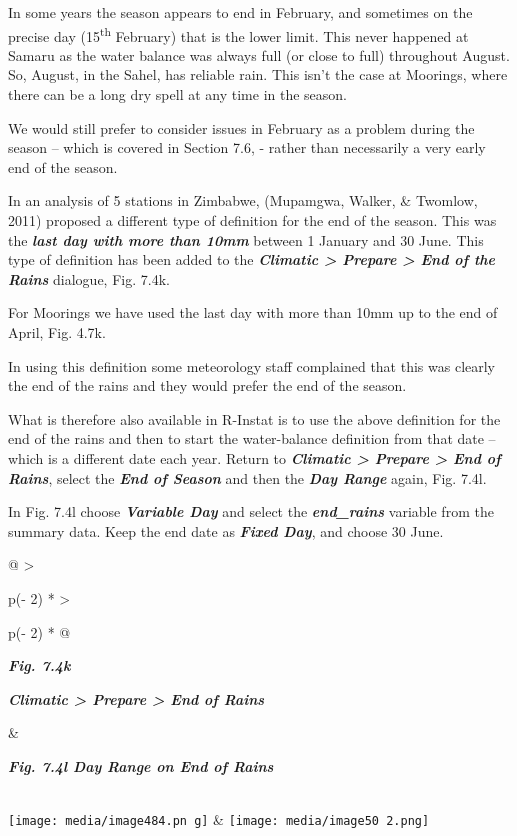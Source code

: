 \documentclass[
  letterpaper,
  DIV=11,
  numbers=noendperiod]{scrreprt}
\begin{document}
In some years the season appears to end in February, and sometimes on
the precise day (15\textsuperscript{th} February) that is the lower
limit. This never happened at Samaru as the water balance was always
full (or close to full) throughout August. So, August, in the Sahel, has
reliable rain. This isn't the case at Moorings, where there can be a
long dry spell at any time in the season.

We would still prefer to consider issues in February as a problem during
the season -- which is covered in Section 7.6, - rather than necessarily
a very early end of the season.

In an analysis of 5 stations in Zimbabwe, (Mupamgwa, Walker, \& Twomlow,
2011) proposed a different type of definition for the end of the season.
This was the \textbf{\emph{last day with more than 10mm}} between 1
January and 30 June. This type of definition has been added to the
\textbf{\emph{Climatic \textgreater{} Prepare \textgreater{} End of the
Rains}} dialogue, Fig. 7.4k.

For Moorings we have used the last day with more than 10mm up to the end
of April, Fig. 4.7k.

In using this definition some meteorology staff complained that this was
clearly the end of the rains and they would prefer the end of the
season.

What is therefore also available in R-Instat is to use the above
definition for the end of the rains and then to start the water-balance
definition from that date -- which is a different date each year. Return
to \textbf{\emph{Climatic \textgreater{} Prepare \textgreater{} End of
Rains}}, select the \textbf{\emph{End of Season}} and then the
\textbf{\emph{Day Range}} again, Fig. 7.4l.

In Fig. 7.4l choose \textbf{\emph{Variable Day}} and select the
\textbf{\emph{end\_rains}} variable from the summary data. Keep the end
date as \textbf{\emph{Fixed Day}}, and choose 30 June.

\begin{longtable}[]{@{}
  >{\raggedright\arraybackslash}p{(\columnwidth - 2\tabcolsep) * }
  >{\raggedright\arraybackslash}p{(\columnwidth - 2\tabcolsep) * }@{}}
\toprule\noalign{}
\begin{minipage}[b]{\linewidth}\raggedright
\textbf{\emph{Fig. 7.4k}}

\textbf{\emph{Climatic \textgreater{} Prepare \textgreater{} End of
Rains}}
\end{minipage} & \begin{minipage}[b]{\linewidth}\raggedright
\textbf{\emph{Fig. 7.4l Day Range on End of Rains}}
\end{minipage} \\
\midrule\noalign{}
\endhead
\bottomrule\noalign{}
\endlastfoot
\texttt{[image: media/image484.pn g]}
&
\texttt{[image: media/image50 2.png]} \\
\end{longtable}
\end{document}
